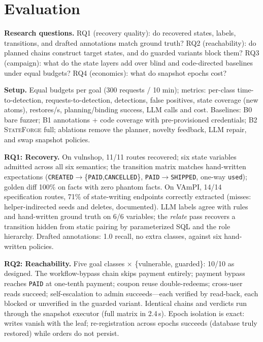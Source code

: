 \documentclass[letterpaper,twocolumn,10pt]{article}
\newcommand{\sys}{\textsc{StateForge}}
\begin{document}
\section{Evaluation}
\label{sec:eval}
\textbf{Research questions.} RQ1 (recovery quality): do recovered states, labels, transitions, and drafted annotations match ground truth? RQ2 (reachability): do planned chains construct target states, and do guarded variants block them? RQ3 (campaign): what do the state layers add over blind and code-directed baselines under equal budgets? RQ4 (economics): what do snapshot epochs cost?

\textbf{Setup.} Equal budgets per goal (300 requests / 10 min); metrics: per-class time-to-detection, requests-to-detection, detections, false positives, state coverage (new atoms), restores/s, planning/binding success, LLM calls and cost. Baselines: B0 bare fuzzer; B1 annotations + code coverage with pre-provisioned credentials; B2 \sys{} full; ablations remove the planner, novelty feedback, LLM repair, and swap snapshot policies.

\textbf{RQ1: Recovery.} On vulnshop, 11/11 routes recovered; six state variables admitted across all six semantics; the transition matrix matches hand-written expectations (\texttt{CREATED}$\to$\{\texttt{PAID},\texttt{CANCELLED}\}, \texttt{PAID}$\to$\texttt{SHIPPED}, one-way \texttt{used}); golden diff 100\% on facts with zero phantom facts. On VAmPI, 14/14 specification routes, 71\% of state-writing endpoints correctly extracted (misses: helper-indirected seeds and deletes, documented). LLM labels agree with rules and hand-written ground truth on 6/6 variables; the \emph{relate} pass recovers a transition hidden from static pairing by parameterized SQL and the role hierarchy. Drafted annotations: 1.0 recall, no extra classes, against six hand-written policies.

\textbf{RQ2: Reachability.} Five goal classes $\times$ \{vulnerable, guarded\}: 10/10 as designed. The workflow-bypass chain skips payment entirely; payment bypass reaches \texttt{PAID} at one-tenth payment; coupon reuse double-redeems; cross-user reads succeed; self-escalation to admin succeeds---each verified by read-back, each blocked or unverified in the guarded variant. Identical chains and verdicts run through the snapshot executor (full matrix in 2.4\,s). Epoch isolation is exact: writes vanish with the leaf; re-registration across epochs succeeds (database truly restored) while orders do not persist.
\end{document}
